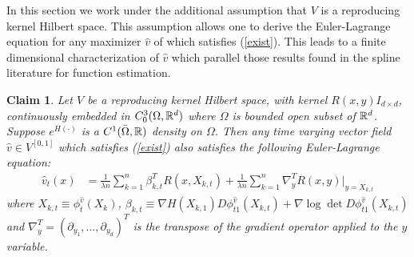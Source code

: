 \documentclass[noinfoline]{imsart}
\newtheorem{claim}{Claim}
\begin{document}
In this section we work under the additional assumption that $V$ is a reproducing kernel Hilbert space. This assumption allows one to derive the Euler-Lagrange equation for any maximizer $\hat v$ of which satisfies (\ref{exist}). This leads to a finite dimensional characterization of  $\hat v$  which  parallel those results found in the spline literature for function estimation. 


\begin{claim}
\label{claim2}
Let $V$ be a  reproducing kernel Hilbert space, with  kernel $R(x,y)I_{d\times d}$, continuously  embedded in $C_0^3(\Omega, \Bbb R^d)$  where $\Omega$ is bounded open subset of $\Bbb R^d$. Suppose $e^{H(\cdot)}$ is a $C^1(\bar \Omega,\Bbb R)$ density  on $\Omega$. Then any time varying vector field $\hat v \in V^{[0,1]}$ which satisfies (\ref{exist}) also satisfies the following
 Euler-Lagrange equation: 
 \begin{align}
 \label{ELeq}
 \hat v_t(x)&=  \frac{1}{\lambda n}\sum_{k=1}^n \beta^T_{k,t} R(x,X_{k,t})  +  \frac{1}{\lambda n}\sum_{k=1}^n   \nabla_{y}^T R(x,y)\Bigr|_{y= X_{k,t}}
\end{align}
where $X_{k,t}\equiv \phi_t^{\hat v} (X_k)$, 
$ \beta_{k,t}\equiv   \nabla H(X_{k,1}) D\phi^{\hat v}_{t1}(X_{k,t})  +\nabla \log\det D\phi^{\hat v}_{t1} (X_{k,t})$ and $\nabla_y^T = (\partial_{y_1},\ldots, \partial_{y_d})^T$  is the transpose of the gradient operator applied to the $y$ variable.
\end{claim}
\end{document}

